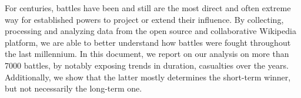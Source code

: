 For centuries, battles have been and still are the most direct and often extreme way for established powers to project or extend their influence. By collecting, processing and analyzing data from the open source and collaborative Wikipedia platform, we are able to better understand how battles were fought throughout the last millennium. In this document, we report on our analysis on more than 7000 battles, by notably exposing trends in duration, casualties over the years. Additionally, we show that the latter mostly determines the short-term winner, but not necessarily the long-term one.